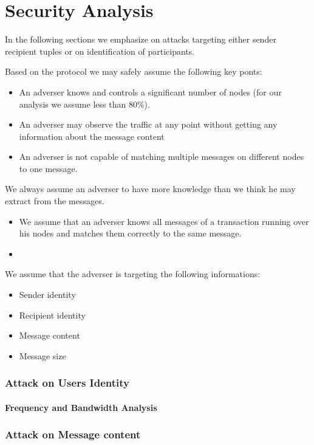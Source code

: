 \chapter{Security Analysis}
In the following sections we emphasize on attacks targeting either sender recipient tuples or on identification of participants. 

Based on the protocol we may safely assume the following key ponts:
\begin{itemize}
	\item An adverser knows and controls a significant number of nodes (for our analysis we assume less than 80\%).
	\item An adverser may observe the traffic at any point without getting any information about the message content
	\item An adverser is not capable of matching multiple messages on different nodes to one message.
\end{itemize}

We always assume an adverser to have more knowledge than we think he may extract from the messages.
\begin{itemize}
	\item We assume that an adverser knows all messages of a transaction running over his nodes and matches them correctly to the same message.
	\item 
\end{itemize}

We assume that the adverser is targeting the following informations:
\begin{itemize}
	\item Sender identity
	\item Recipient identity
	\item Message content
	\item Message size
\end{itemize}

\subsection{Attack on Users Identity}

\subsubsection{Frequency and Bandwidth Analysis}

\subsection{Attack on Message content}

